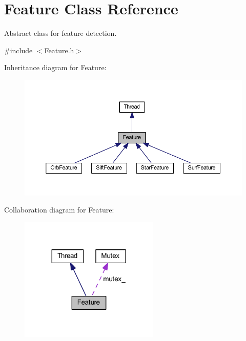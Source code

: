 \hypertarget{class_feature}{\section{Feature Class Reference}
\label{class_feature}
}


Abstract class for feature detection.  




{\ttfamily \#include $<$Feature.\-h$>$}



Inheritance diagram for Feature\-:
\nopagebreak
\begin{figure}[H]
\begin{center}
\leavevmode
\includegraphics[width=350pt]{class_feature__inherit__graph}
\end{center}
\end{figure}


Collaboration diagram for Feature\-:\nopagebreak
\begin{figure}[H]
\begin{center}
\leavevmode
\includegraphics[width=188pt]{class_feature__coll__graph}
\end{center}
\end{figure}
